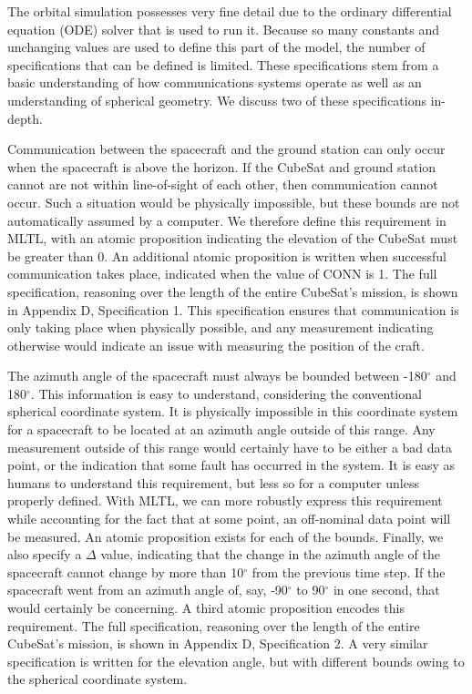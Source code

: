 \documentclass[conf]{new-aiaa}
\begin{document}
The orbital simulation possesses very fine detail due to the ordinary differential equation (ODE) solver that is used to run it. Because so many constants and unchanging values are used to define this part of the model, the number of specifications that can be defined is limited. These specifications stem from a basic understanding of how communications systems operate as well as an understanding of spherical geometry. We discuss two of these specifications in-depth. 

Communication between the spacecraft and the ground station can only occur when the spacecraft is above the horizon. If the CubeSat and ground station cannot are not within line-of-sight of each other, then communication cannot occur. Such a situation would be physically impossible, but these bounds are not automatically assumed by a computer. We therefore define this requirement in MLTL, with an atomic proposition indicating the elevation of the CubeSat must be greater than 0. An additional atomic proposition is written when successful communication takes place, indicated when the value of CONN is 1. The full specification, reasoning over the length of the entire CubeSat's mission, is shown in Appendix D, Specification 1. This specification ensures that communication is only taking place when physically possible, and any measurement indicating otherwise would indicate an issue with measuring the position of the craft.

The azimuth angle of the spacecraft must always be bounded between -180$^{\circ}$ and 180$^{\circ}$. This information is easy to understand, considering the conventional spherical coordinate system. It is physically impossible in this coordinate system for a spacecraft to be located at an azimuth angle outside of this range. Any measurement outside of this range would certainly have to be either a bad data point, or the indication that some fault has occurred in the system. It is easy as humans to understand this requirement, but less so for a computer unless properly defined. With MLTL, we can more robustly express this requirement while accounting for the fact that at some point, an off-nominal data point will be measured. An atomic proposition exists for each of the bounds. Finally, we also specify a $\Delta$ value, indicating that the change in the azimuth angle of the spacecraft cannot change by more than 10$^{\circ}$ from the previous time step. If the spacecraft went from an azimuth angle of, say, -90$^{\circ}$ to 90$^{\circ}$ in one second, that would certainly be concerning. A third atomic proposition encodes this requirement. The full specification, reasoning over the length of the entire CubeSat's mission, is shown in Appendix D, Specification 2. A very similar specification is written for the elevation angle, but with different bounds owing to the spherical coordinate system.
\end{document}
